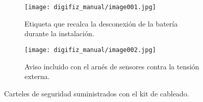 \begin{figure}[htbp]
    \centering
    \begin{subfigure}{0.46\textwidth}
        \texttt{[image: digifiz\_manual/image001.jpg]}
        \caption{Etiqueta que recalca la desconexión de la batería durante la instalación.}
    \end{subfigure}\hfill
    \begin{subfigure}{0.46\textwidth}
        \texttt{[image: digifiz\_manual/image002.jpg]}
        \caption{Aviso incluido con el arnés de sensores contra la tensión externa.}
    \end{subfigure}
    \caption{Carteles de seguridad suministrados con el kit de cableado.}
\end{figure}
